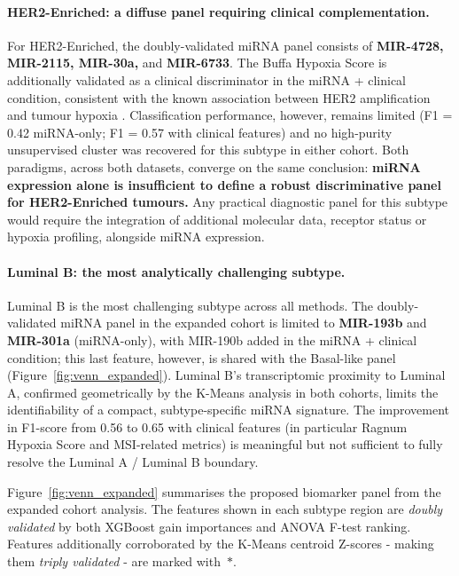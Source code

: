 \paragraph{HER2-Enriched: a diffuse panel requiring clinical complementation.}
For HER2-Enriched, the doubly-validated miRNA panel consists of \textbf{MIR-4728,
MIR-2115, MIR-30a,} and \textbf{MIR-6733}. The Buffa Hypoxia Score is additionally
validated as a clinical discriminator in the miRNA + clinical condition, consistent
with the known association between HER2 amplification and tumour hypoxia
\cite{clinical_implication_bca_Adamo2015}. Classification performance, however, remains
limited (F1 = 0.42 miRNA-only; F1 = 0.57 with clinical features) and no high-purity
unsupervised cluster was recovered for this subtype in either cohort. Both paradigms,
across both datasets, converge on the same conclusion: \textbf{miRNA expression alone
is insufficient to define a robust discriminative panel for HER2-Enriched tumours.}
Any practical diagnostic panel for this subtype would require the integration of
additional molecular data, receptor status or hypoxia profiling, alongside miRNA
expression.
 
\paragraph{Luminal B: the most analytically challenging subtype.}
Luminal B is the most challenging subtype across all methods. The doubly-validated
miRNA panel in the expanded cohort is limited to \textbf{MIR-193b} and
\textbf{MIR-301a} (miRNA-only), with MIR-190b added in the miRNA + clinical
condition; this last feature, however, is shared with the Basal-like panel
(Figure~\ref{fig:venn_expanded}). Luminal B's transcriptomic proximity to Luminal A,
 confirmed geometrically by the K-Means analysis in both cohorts, limits the
identifiability of a compact, subtype-specific miRNA signature. The improvement in
F1-score from 0.56 to 0.65 with clinical features (in particular Ragnum Hypoxia
Score and MSI-related metrics) is meaningful but not sufficient to fully resolve
the Luminal A / Luminal B boundary.

Figure~\ref{fig:venn_expanded} summarises the proposed biomarker panel from the
expanded cohort analysis. The features shown in each subtype region are
\textit{doubly validated} by both XGBoost gain importances and ANOVA F-test ranking.
Features additionally corroborated by the K-Means centroid Z-scores - making them
\textit{triply validated} - are marked with~$\ast$.
 

